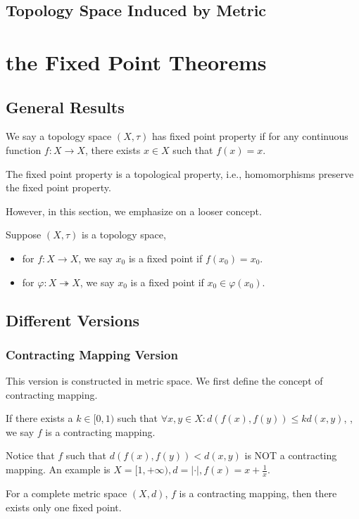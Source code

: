 \subsection{Topology Space Induced by Metric}




\section{the Fixed Point Theorems}
\subsection{General Results}
\begin{definition}
    We say a topology space $(X,\tau)$ has fixed point property if for any continuous function $f:X\to X$, there exists $x\in X$ such that $f(x) = x$.
\end{definition}

\begin{theorem}
    The fixed point property is a topological property, i.e., homomorphisms preserve the fixed point property.
\end{theorem}

However, in this section, we emphasize on a looser concept.
\begin{definition}
    Suppose $(X,\tau)$ is a topology space,
    \begin{itemize}
        \item for $f:X\to X$, we say $x_0$ is a fixed point if $f(x_0) = x_0$.
        \item for $\varphi: X\twoheadrightarrow X$, we say $x_0$ is a fixed point if $x_0\in \varphi (x_0)$.
    \end{itemize}
\end{definition}

\subsection{Different Versions}
\subsubsection{Contracting Mapping Version}
This version is constructed in metric space. We first define the concept of contracting mapping.
\begin{definition}
    If there exists a $k\in [0,1)$ such that $\forall x,y\in X: d(f(x),f(y))\leq k d(x,y)$, , we say $f$ is a contracting mapping.
\end{definition}
\begin{remark}
    Notice that $f$ such that $ d(f(x),f(y))< d(x,y)$ is NOT a contracting mapping. An example is $X=[1,+\infty), d = |\cdot|, f(x)=x+\frac{1}{x}$.
\end{remark}
\begin{theorem}
    For a complete metric space $(X,d)$, $f$ is a contracting mapping, then there exists only one fixed point.
\end{theorem}
